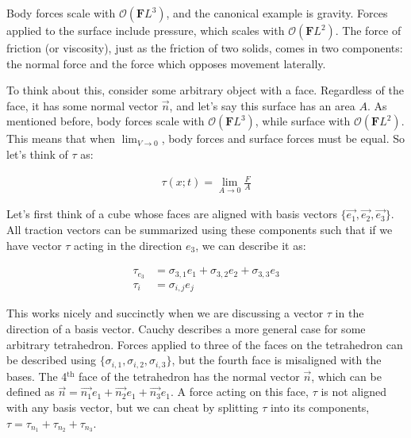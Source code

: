 Body forces scale with $\mathcal{O} (\mathbf{F}L^3)$, and the canonical example is gravity. Forces applied to the surface include pressure, which scales with $\mathcal{O} (\mathbf{F}L^2)$. The force of friction (or viscosity), just as the friction of two solids, comes in two components: the normal force and the force which opposes movement laterally. \newline

To think about this, consider some arbitrary object with a face. Regardless of the face, it has some normal vector $\Vec{n}$, and let's say this surface has an area $A$. As mentioned before, body forces scale with $\mathcal{O} (\mathbf{F}L^3)$, while surface with $\mathcal{O} (\mathbf{F}L^2)$. This means that when $\lim_{V\to 0}$, body forces and surface forces must be equal. So let's think of $\tau$ as:

\begin{equation} \label{phenom1}
\begin{split}
 \tau(x;t) = \lim_{A\to 0}\frac{F}{A}
\end{split}
\end{equation}

Let's first think of a cube whose faces are aligned with basis vectors $\{\Vec{e_1}, \Vec{e_2}, \Vec{e_3}\}$. All traction vectors can be summarized using these components such that if we have vector $\tau$ acting in the direction $e_3$, we can describe it as:

\begin{equation} \label{phenom1}
\begin{split}
 \tau_{e_3} &= \sigma_{3,1}e_1 + \sigma_{3,2}e_2 + \sigma_{3,3}e_3\\
\tau_{i} &= \sigma_{i,j}e_j
\end{split}
\end{equation}

This works nicely and succinctly when we are discussing a vector $\tau$ in the direction of a basis vector. Cauchy describes a more general case for some arbitrary tetrahedron. Forces applied to three of the faces on the tetrahedron can be described using $\{\sigma_{i,1}, \sigma_{i,2}, \sigma_{i,3}\}$, but the fourth face is misaligned with the bases. The 4$^\mathrm{th}$ face of the tetrahedron has the normal vector $\Vec{n}$, which can be defined as $\Vec{n} = \Vec{n_1}e_1 + \Vec{n_2}e_1 + \Vec{n_3}e_1$. A force acting on this face, $\tau$ is not aligned with any basis vector, but we can cheat by splitting $\tau$ into its components, $\tau = \tau_{n_1} + \tau_{n_2}+ \tau_{n_3}$.\newline

